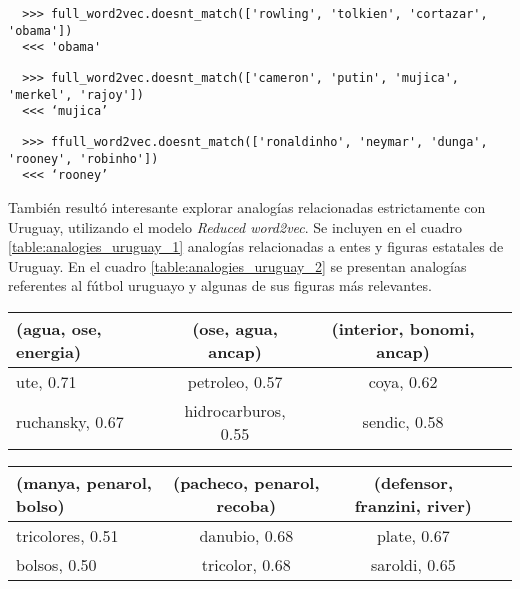 \begin{lstlisting}
  >>> full_word2vec.doesnt_match(['rowling', 'tolkien', 'cortazar', 'obama'])
  <<< 'obama'
\end{lstlisting}

\begin{lstlisting}
  >>> full_word2vec.doesnt_match(['cameron', 'putin', 'mujica', 'merkel', 'rajoy'])
  <<< ‘mujica’
\end{lstlisting}

\begin{lstlisting}
  >>> ffull_word2vec.doesnt_match(['ronaldinho', 'neymar', 'dunga', 'rooney', 'robinho'])
  <<< ‘rooney’
\end{lstlisting}

También resultó interesante explorar analogías relacionadas estrictamente con Uruguay,
utilizando el modelo \textit{Reduced word2vec}. Se incluyen en el cuadro
\ref{table:analogies_uruguay_1} analogías relacionadas a entes y figuras estatales de
Uruguay. En el cuadro \ref{table:analogies_uruguay_2} se presentan analogías referentes
al fútbol uruguayo y algunas de sus figuras más relevantes.

\begin{table*}[ht]
    \centering
    \begin{tabular}{lccc}
        \hline
        (agua, ose, energia) & (ose, agua, ancap) & (interior, bonomi, ancap)\\
        \hline
        ute, 0.71 & petroleo, 0.57 & coya, 0.62\\
        ruchansky, 0.67 & hidrocarburos, 0.55 & sendic, 0.58\\
        \hline
    \end{tabular}
    \caption{Analogías relacionadas a entes públicos uruguayos.}
    \label{table:analogies_uruguay_1}
\end{table*}

\begin{table*}[ht]
    \centering
    \begin{tabular}{lccc}
        \hline
        (manya, penarol, bolso) & (pacheco, penarol, recoba) & (defensor, franzini, river)\\
        \hline
        tricolores, 0.51 & danubio, 0.68 & plate, 0.67\\
        bolsos, 0.50 & tricolor, 0.68 & saroldi, 0.65\\
        \hline
    \end{tabular}
    \caption{Analogías relacionadas al fútbol uruguayo.}
    \label{table:analogies_uruguay_2}
\end{table*}

